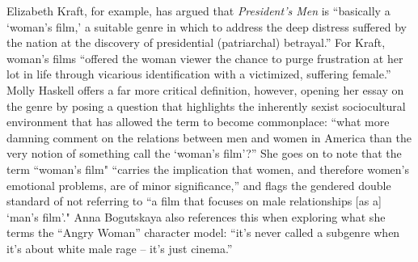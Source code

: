 Elizabeth Kraft, for example, has argued that \textit{President’s Men} is ``basically a `woman’s film,’ a suitable genre in which to address the deep distress suffered by the nation at the discovery of presidential (patriarchal) betrayal.”\autocites[][31]{kraft_all_2008}
For Kraft, woman’s films ``offered the woman viewer the chance to purge frustration at her lot in life through vicarious identification with a victimized, suffering female.”\autocites[][31]{kraft_all_2008}
Molly Haskell offers a far more critical definition, however, opening her essay on the genre by posing a question that highlights the inherently sexist sociocultural environment that has allowed the term to become commonplace:
``what more damning comment on the relations between men and women in America than the very notion of something call the `woman’s film’?”\autocites[][20]{haskell_womans_1999}
She goes on to note that the term ``woman’s film" ``carries the implication that women, and therefore women’s emotional problems, are of minor significance,” and flags the gendered double standard of not referring to ``a film that focuses on male relationships [as a] `man’s film’."\autocites[][20]{haskell_womans_1999}
Anna Bogutskaya also references this when exploring what she terms the ``Angry Woman” character model: ``it’s never called a subgenre when it’s about white male rage – it’s just cinema.”\autocites[][141]{bogutskaya_unlikeable_2023}

